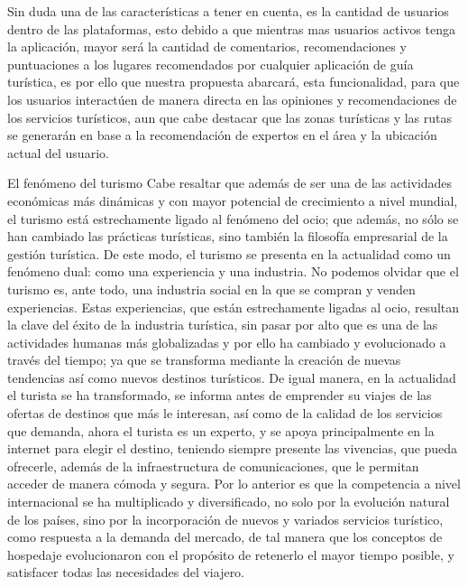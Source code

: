 Sin duda una de las características a tener en cuenta, es la cantidad de usuarios dentro de las plataformas, esto debido a que mientras mas usuarios activos tenga la aplicación, mayor será la cantidad de comentarios, recomendaciones y puntuaciones a los lugares recomendados por cualquier aplicación de guía turística, es por ello que nuestra propuesta abarcará, esta funcionalidad, para que los usuarios interactúen de manera directa en las opiniones y recomendaciones de los servicios turísticos, aun que cabe destacar que las zonas turísticas y las rutas se generarán en base a la recomendación de expertos en el área y la ubicación actual del usuario.




El fenómeno del turismo
Cabe resaltar que además de ser una de las actividades económicas más dinámicas y con mayor potencial de crecimiento a nivel mundial, el turismo está estrechamente ligado al fenómeno del ocio; que además, no sólo se han cambiado las prácticas turísticas, sino también la filosofía empresarial de la gestión turística. De este modo, el turismo se presenta en la actualidad como un fenómeno dual: como una experiencia y una industria. No podemos olvidar que el turismo es, ante todo, una industria social en la que se compran y venden experiencias. Estas experiencias, que están estrechamente ligadas al ocio, resultan la clave del éxito de la industria turística, sin pasar por alto que es una de las actividades humanas más globalizadas y por ello ha cambiado y evolucionado a través del tiempo; ya que se transforma mediante la creación de nuevas tendencias así como nuevos destinos turísticos.
De igual manera, en la actualidad el turista se ha transformado, se informa antes de emprender su viajes de las ofertas de destinos que más le interesan, así como de la calidad de los servicios que demanda, ahora el turista es un experto, y se apoya principalmente en la internet para elegir el destino, teniendo siempre presente las vivencias, que pueda ofrecerle, además de la infraestructura de comunicaciones, que le permitan acceder de manera cómoda y segura. Por lo anterior es que la competencia a nivel internacional se ha multiplicado y diversificado, no solo por la evolución natural de los países, sino por la incorporación de nuevos y variados servicios turístico, como respuesta a la demanda del mercado, de tal manera que los conceptos de hospedaje evolucionaron con el propósito de retenerlo el mayor tiempo posible, y satisfacer todas las necesidades del viajero.





